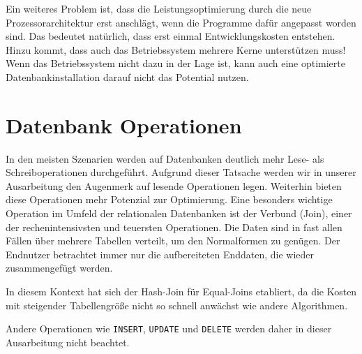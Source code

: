 Ein weiteres Problem ist, dass die Leistungsoptimierung durch die neue Prozessorarchitektur erst anschlägt, wenn die Programme dafür angepasst worden sind. Das bedeutet natürlich, dass erst einmal Entwicklungskosten entstehen. Hinzu kommt, dass auch das Betriebssystem mehrere Kerne unterstützen muss! Wenn das Betriebssystem nicht dazu in der Lage ist, kann auch eine optimierte Datenbankinstallation darauf nicht das Potential nutzen.

\section{Datenbank Operationen}
\label{sec:Operationen}
In den meisten Szenarien werden auf Datenbanken deutlich mehr Lese- als Schreiboperationen durchgeführt. Aufgrund dieser Tatsache werden wir in unserer Ausarbeitung den Augenmerk auf lesende Operationen legen. Weiterhin bieten diese Operationen mehr Potenzial zur Optimierung. Eine besonders wichtige Operation im Umfeld der relationalen Datenbanken ist der Verbund (Join), einer der rechenintensivsten und teuersten Operationen. Die Daten sind in fast allen Fällen über mehrere Tabellen verteilt, um den Normalformen zu genügen. Der Endnutzer betrachtet immer nur die aufbereiteten Enddaten, die wieder zusammengefügt werden.

In diesem Kontext hat sich der Hash-Join für Equal-Joins etabliert, da die Kosten mit steigender Tabellengröße nicht so schnell anwächst wie andere Algorithmen. 

Andere Operationen wie \texttt{INSERT}, \texttt{UPDATE} und \texttt{DELETE} werden daher in dieser Ausarbeitung nicht beachtet.
